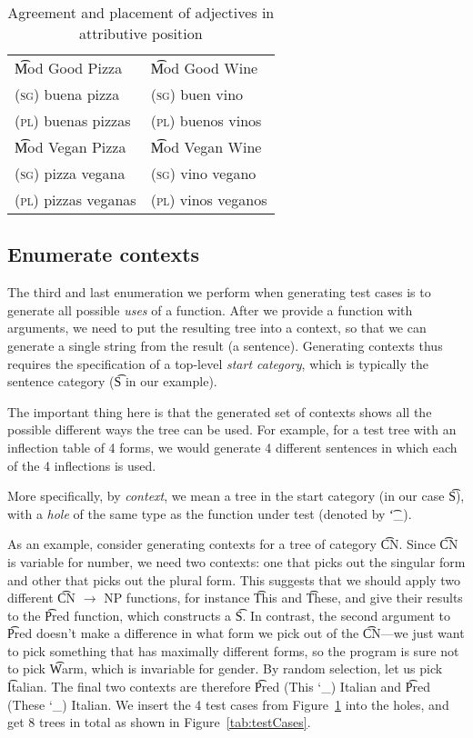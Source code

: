 \begin{table}[h]
\centering
\begin{tabular}{| l | l |}
\hline
\t{Mod Good Pizza}   & \t{Mod Good Wine} \\ 
\textsc{(sg)} buena pizza             & \textsc{(sg)} buen vino \\
\textsc{(pl)} buenas pizzas           & \textsc{(pl)} buenos vinos \\ \hline

\t{Mod Vegan Pizza}   & \t{Mod Vegan Wine} \\ 
\textsc{(sg)} pizza vegana            & \textsc{(sg)} vino vegano \\
\textsc{(pl)} pizzas veganas          & \textsc{(pl)} vinos veganos \\ \hline
\end{tabular}
\caption{Agreement and placement of adjectives in attributive position}
\label{tab:adjAttr}
\end{table}

\subsection{Enumerate contexts} The third and last enumeration we
perform when generating test cases is to generate all possible
\emph{uses} of a function. After we provide a function with arguments,
we need to put the resulting tree into a context, so that we can generate a
single string from the result (a sentence). Generating contexts thus requires the specification of a top-level \emph{start category}, which is typically the sentence category (\t{S} in our example).

The important thing here is that the generated set of contexts shows
all the possible different ways the tree can be used. For example, for
a test tree with an inflection table of 4 forms, we would generate 4 different sentences in which each of the 4 inflections is used.

More specifically, by \emph{context}, we mean a tree in the start category (in our case \t{S}), with a \emph{hole} of the same type as the function under test (denoted by \t{\char`_}).

As an example, consider generating contexts for a tree of category \t{CN}.
Since \t{CN} is variable for number, we need two contexts: 
one that picks out the singular form and other that picks out
the plural form. 
This suggests that we should apply two different
\t{CN $\rightarrow$ NP} functions, for instance \t{This} and \t{These}, and
give their results to the \t{Pred} function, which constructs a \t{S}.
In contrast, the second argument to \t{Pred} doesn't make a difference
in what form we pick out of the \t{CN}---we just want to pick
something that has maximally different forms, so the program is sure
not to pick \t{Warm}, which is invariable for gender. By random
selection, let us pick \t{Italian}.
The final two contexts are therefore \t{Pred (This \char`_) Italian} and \t{Pred (These \char`_) Italian}.
We insert the 4 test cases from Figure~\ref{tab:adjAttr} into the
holes, and get 8 trees in total as shown in Figure~\ref{tab:testCases}.

